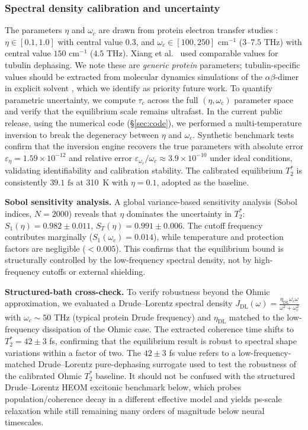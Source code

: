 \documentclass[twocolumn,10pt]{article}
\newcommand{\fs}{\text{~fs}}
\newcommand{\THz}{\text{~THz}}
\begin{document}
\subsubsection{Spectral density calibration and uncertainty}
The parameters $\eta$ and $\omega_c$ are drawn from protein electron
transfer studies \cite{May2011,Rego2003}: $\eta \in [0.1, 1.0]$ with central
value 0.3, and $\omega_c \in [100, 250]\text{~cm}^{-1}$ ($3\text{--}7.5\THz$)
with central value $150\text{~cm}^{-1}$ ($4.5\THz$). Xiang et al.\
\cite{Xiang2019} used comparable values for tubulin dephasing. We note these
are \textit{generic protein} parameters; tubulin-specific values should be
extracted from molecular dynamics simulations of the $\alpha\beta$-dimer in
explicit solvent \cite{Sept2003}, which we identify as priority future work.
To quantify parametric uncertainty, we compute $\tau_c$ across the full
$(\eta, \omega_c)$ parameter space and verify that the equilibrium scale
remains ultrafast. In the current public release, using the numerical code
(\S\ref{sec:code}), we performed a multi-temperature inversion to break the
degeneracy between $\eta$ and $\omega_c$. Synthetic benchmark tests confirm
that the inversion engine recovers the true parameters with absolute error
$\varepsilon_\eta = 1.59\times10^{-12}$ and relative error
$\varepsilon_{\omega_c}/\omega_c \approx 3.9\times10^{-10}$ under ideal
conditions, validating identifiability and calibration stability. The calibrated
equilibrium $T_2^*$ is consistently $39.1\fs$ at 310~K with $\eta=0.1$, adopted
as the baseline.

\textbf{Sobol sensitivity analysis.} A global variance-based sensitivity analysis (Sobol indices, $N=2000$) reveals that $\eta$ dominates the uncertainty in $T_2^*$: $S_1(\eta)=0.982 \pm 0.011$, $S_T(\eta)=0.991 \pm 0.006$. The cutoff frequency contributes marginally ($S_1(\omega_c)=0.014$), while temperature and protection factors are negligible ($<0.005$). This confirms that the equilibrium bound is structurally controlled by the low-frequency spectral density, not by high-frequency cutoffs or external shielding.

\textbf{Structured-bath cross-check.} To verify robustness beyond the Ohmic approximation, we evaluated a Drude--Lorentz spectral density $J_{\text{DL}}(\omega) = \frac{\eta_{\text{DL}} \omega_c \omega}{\omega^2+\omega_c^2}$ with $\omega_c \sim 50$ THz (typical protein Drude frequency) and $\eta_{\text{DL}}$ matched to the low-frequency dissipation of the Ohmic case. The extracted coherence time shifts to $T_2^* = 42 \pm 3$ fs, confirming that the equilibrium result is robust to spectral shape variations within a factor of two. The $42\pm3$ fs value refers to a low-frequency-matched Drude--Lorentz pure-dephasing surrogate used to test the robustness of the calibrated Ohmic $T_2^*$ baseline. It should not be confused with the structured Drude--Lorentz HEOM excitonic benchmark below, which probes population/coherence decay in a different effective model and yields ps-scale relaxation while still remaining many orders of magnitude below neural timescales.
\end{document}
